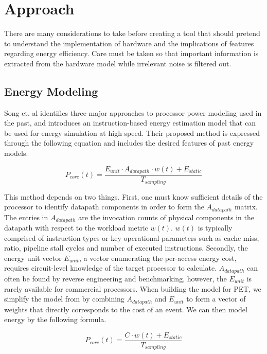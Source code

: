 \section{Approach}

There are many considerations to take before creating a tool that should pretend
to understand the implementation of hardware and the implications of features
regarding energy efficiency. Care must be taken so that important information is
extracted from the hardware model while irrelevant noise is filtered out.


\subsection{Energy Modeling}

Song et. al \cite{song2012instruction} identifies three major approaches to
processor power modeling used in the past, and introduces an instruction-based
energy estimation model that can be used for energy simulation at high speed.
Their proposed method is expressed through the following equation and includes
the desired features of past energy models.

\begin{equation}
    P_{core}(t) = \frac{E_{unit} \cdot A_{datapath} \cdot w(t) +
    E_{static}}{T_{sampling}}
\end{equation}

This method depends on two things. First, one must know sufficient details of
the processor to identify datapath components in order to form the
$A_{datapath}$ matrix. The entries in $A_{datapath}$ are the invocation counts
of physical components in the datapath with respect to the workload metric
$w(t)$. $w(t)$ is typically comprised of instruction types or key operational
parameters such as cache miss, ratio, pipeline stall cycles and number of
executed instructions. Secondly, the energy unit vector $E_{unit}$, a vector
enumerating the per-access energy cost, requires circuit-level knowledge of the
target processor to calculate. $A_{datapath}$ can often be found by reverse
engineering and benchmarking, however, the $E_{unit}$ is rarely available for
commercial processors. When building the model for PET, we simplify the model
from \cite{song2012instruction} by combining $A_{datapath}$ and $E_{unit}$ to
form a vector of weights that directly corresponds to the cost of an event. We
can then model energy by the following formula.

\begin{equation}
    P_{core}(t) = \frac{C \cdot w(t) + E_{static}}{T_{sampling}}
\end{equation}

